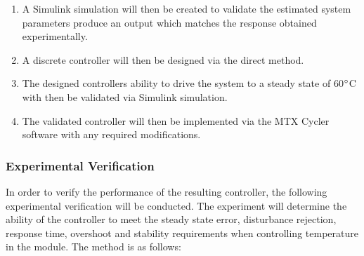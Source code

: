 \begin{enumerate}
	\item A Simulink simulation will then be created to validate the estimated system parameters produce an output which matches the response obtained experimentally.
	\item A discrete controller will then be designed via the direct method.
	\item The designed controllers ability to drive the system to a steady state of 60$\degree$C with then be validated via Simulink simulation.
	\item  The validated controller will then be implemented via the MTX Cycler software with any required modifications.
\end{enumerate}

\subsubsection{Experimental Verification}

In order to verify the performance of the resulting controller, the following experimental verification will be conducted. The experiment will determine the ability of the controller to meet the steady state error, disturbance rejection, response time, overshoot and stability requirements when controlling temperature in the module. The method is as follows:

